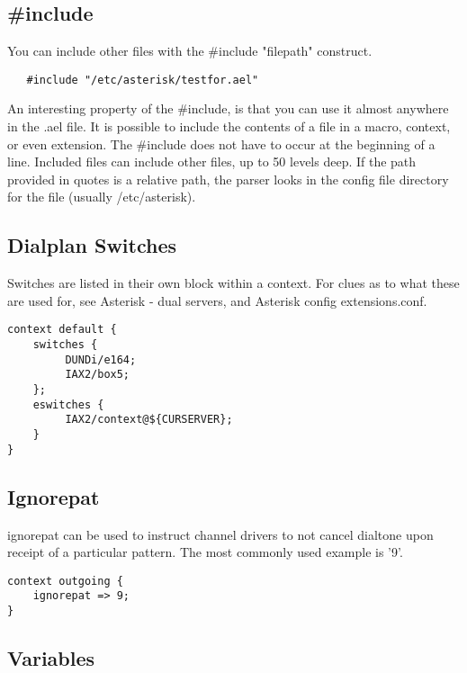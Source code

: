 {\subsection{\#include}

You can include other files with the \#include "filepath" construct.

\begin{verbatim}
   #include "/etc/asterisk/testfor.ael"
\end{verbatim}

An interesting property of the \#include, is that you can use it almost
anywhere in the .ael file. It is possible to include the contents of
a file in a macro, context, or even extension.  The \#include does not
have to occur at the beginning of a line. Included files can include
other files, up to 50 levels deep. If the path provided in quotes is a
relative path, the parser looks in the config file directory for the
file (usually /etc/asterisk).



\subsection{Dialplan Switches}

Switches are listed in their own block within a context. For clues as
to what these are used for, see Asterisk - dual servers, and Asterisk
config extensions.conf.

\begin{verbatim}
context default {
    switches {
         DUNDi/e164;
         IAX2/box5;
    };
    eswitches {
         IAX2/context@${CURSERVER};
    }
}
\end{verbatim}


\subsection{Ignorepat}

ignorepat can be used to instruct channel drivers to not cancel
dialtone upon receipt of a particular pattern. The most commonly used
example is '9'.

\begin{verbatim}
context outgoing {
    ignorepat => 9;
}
\end{verbatim}


\subsection{Variables}

}
